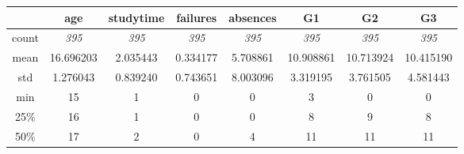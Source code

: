 \documentclass{article}
\begin{document}
\begin{table}[H]
\begin{tabular}{cccccccc}
      & \cellcolor[HTML]{DAE8FC}\textbf{age} & \cellcolor[HTML]{DAE8FC}\textbf{studytime} & \cellcolor[HTML]{DAE8FC}\textbf{failures} & \cellcolor[HTML]{DAE8FC}\textbf{absences} & \cellcolor[HTML]{DAE8FC}\textbf{G1} & \cellcolor[HTML]{DAE8FC}\textbf{G2} & \cellcolor[HTML]{DAE8FC}\textbf{G3} \\ \hline
\rowcolor[HTML]{FFFFFF} 
count & \textit{395}                         & \textit{395}                               & \textit{395}                              & \textit{395}                              & \textit{395}                        & \textit{395}                        & \textit{395}                        \\
\rowcolor[HTML]{EFEFEF} 
mean  & 16.696203                            & 2.035443                                   & 0.334177                                  & 5.708861                                  & 10.908861                           & 10.713924                           & 10.415190                           \\
\rowcolor[HTML]{FFFFFF} 
std   & 1.276043                             & 0.839240                                   & 0.743651                                  & 8.003096                                  & 3.319195                            & 3.761505                            & 4.581443                            \\
\rowcolor[HTML]{EFEFEF} 
min   & 15                                   & 1                                          & 0                                         & 0                                         & 3                                   & 0                                   & 0                                   \\
\rowcolor[HTML]{FFFFFF} 
25\%  & 16                                   & 1                                          & 0                                         & 0                                         & 8                                   & 9                                   & 8                                   \\
\rowcolor[HTML]{EFEFEF} 
50\%  & 17                                   & 2                                          & 0                                         & 4                                         & 11                                  & 11                                  & 11                                  \\

\end{tabular}
\end{table}
\end{document}
